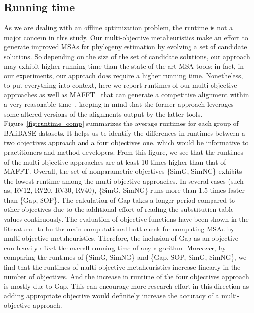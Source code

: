 \subsection{Running time}\label{sec:run}
As we are dealing with an offline optimization problem, the runtime is not a major concern in this study. Our multi-objective metaheuristics make an effort to generate improved MSAs for phylogeny estimation by evolving a set of candidate solutions. So depending on the size of the set of candidate solutions, our approach may exhibit higher running time than the state-of-the-art MSA tools; in fact, in our experiments, our approach does require a higher running time. Nonetheless, to put everything into context, here we report runtimes of our multi-objective approaches as well as MAFFT~\citep{katoh2002mafft} that can generate a competitive alignment within a very reasonable time~\citep{ashkenazy2018multiple}, keeping in mind that the former approach leverages some altered versions of the alignments output by the latter tools. Figure~\ref{fig:runtime_comp} summarizes the average runtimes for each group of BAliBASE datasets. It helps us to identify the differences in runtimes between a two objectives approach and a four objectives one, which would be informative to practitioners and method developers. From this figure, we see that the runtimes of the multi-objective approaches are at least 10 times higher than that of MAFFT. Overall, the set of nonparametric objectives \{SimG, SimNG\} exhibits the lowest runtime among the multi-objective approaches. In several cases (such as, RV12, RV20, RV30, RV40), \{SimG, SimNG\} runs more than 1.5 times faster than \{Gap, SOP\}. The calculation of Gap takes a longer period compared to other objectives due to the additional effort of reading the substitution table values continuously. The evaluation of objective functions have been shown in the literature~\citep{zambrano2017m2align} to be the main computational bottleneck for computing MSAs by multi-objective metaheuristics. Therefore, the inclusion of Gap as an objective can heavily affect the overall running time of any algorithm. Moreover, by comparing the runtimes of \{SimG, SimNG\} and \{Gap, SOP, SimG, SimNG\}, we find that the runtimes of multi-objective metaheuristics increase linearly in the number of objectives. And the increase in runtime of the four objectives approach is mostly due to Gap. This can encourage more research effort in this direction as adding appropriate objective would definitely increase the accuracy of a multi-objective approach.

